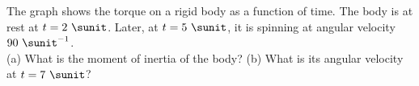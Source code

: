 The graph shows the torque on a rigid body as a function of time. The
body is at rest at $t=2\ \sunit$.
Later, at $t=5\ \sunit$, it is spinning at angular
velocity $90\ \sunit^{-1}$.\\
%
(a) What is the moment of inertia of the body?\answercheck\hwendpart
%
(b) What is its angular velocity at $t=7\ \sunit$?\answercheck
